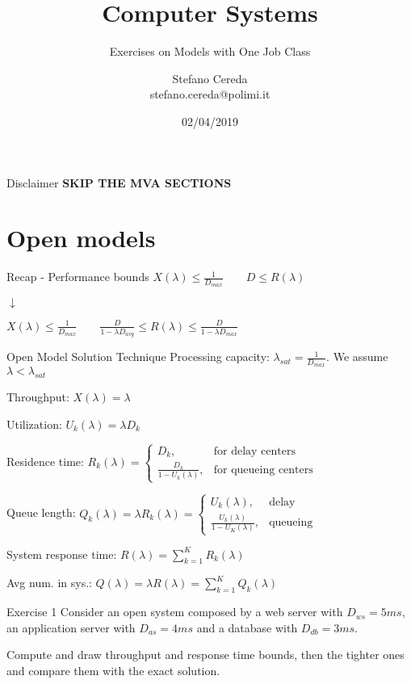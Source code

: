 \documentclass{beamer}
\title{Computer Systems}
\subtitle{Exercises on Models with One Job Class}
\author{Stefano Cereda \\ stefano.cereda@polimi.it}
\date{02/04/2019}
\institute[PoliMi]{\vspace{0.5cm}\centering Politecnico di Milano \\ \vspace{0.2cm}
	\texttt{[image: ../logopolimi]}}
\begin{document}
\begin{frame}
	\maketitle
\end{frame}

\begin{frame}{Disclaimer}
\centering\textbf{\alert{\huge{SKIP THE MVA SECTIONS}}}
\end{frame}

\section{Open models}

\begin{frame}{Recap - Performance bounds}
\centering
$X(\lambda) \leq \frac{1}{D_{max}} \qquad D \leq R(\lambda)$

$\downarrow$

$X(\lambda) \leq \frac{1}{D_{max}} \qquad \frac{D}{1-\lambda D_{avg}} \leq R(\lambda) \leq \frac{D}{1-\lambda D_{max}}$
\end{frame}

\begin{frame}{Open Model Solution Technique}
Processing capacity: $\lambda_{sat}  = \frac{1}{D_{max}}$. We assume $\lambda < \lambda_{sat}$

Throughput: $X(\lambda) = \lambda$

Utilization: $U_k(\lambda) = \lambda D_k$

Residence time: $R_k(\lambda) =
\begin{cases}
	D_k,& \text{for delay centers} \\
	\frac{D_k}{1-U_k(\lambda)},& \text{for queueing centers}
\end{cases}
$

Queue length: $Q_k(\lambda) = \lambda R_k(\lambda) =
\begin{cases}
	U_k(\lambda),& \text{delay} \\
	\frac{U_k(\lambda)}{1-U_K(\lambda)},& \text{queueing}
\end{cases}
$

System response time: $R(\lambda) = \sum_{k=1}^K R_k(\lambda)$

Avg num. in sys.: $Q(\lambda) = \lambda R(\lambda) = \sum_{k=1}^K Q_k(\lambda)$
\end{frame}

\begin{frame}{Exercise 1}
Consider an open system composed by a web server with $D_{ws} = 5ms$, an application server with $D_{as} = 4ms$ and a database with $D_{db} = 3ms$.

Compute and draw throughput and response time bounds, then the tighter ones and compare them with the exact solution.
\end{frame}
\end{document}
